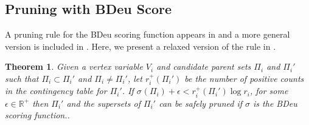 \documentclass[letterpaper]{article}
\newcommand{\score}[2]{\sigma_{#1}({#2})}
\newtheorem{theorem}{Theorem}
\begin{document}
\subsection{Pruning with BDeu Score}

A pruning rule for the BDeu scoring function appears in \cite{Campos2017} and a more general version is included in \cite{cussens2015gobnilp}. Here, we present a relaxed version of the rule in \cite{cussens2015gobnilp}.






\begin{theorem}
Given a vertex variable $V_i$ and candidate parent sets $\Pi_i$ and $\Pi_i'$ such that $\Pi_i \subset \Pi_i'$ and $\Pi_i \neq \Pi_i'$, let
$r_i^{+}(\Pi_i')$ be the number of positive counts in the contingency table for $\Pi_i'$. If $\score{}{\Pi_i} + \epsilon < r_i^{+}(\Pi_i') \log r_i$, for some $\epsilon \in \mathbb{R^+}$ then $\Pi_i'$ and the supersets of $\Pi_i'$ can be safely pruned if $\sigma$ is the BDeu scoring function..
\end{theorem}
\end{document}
